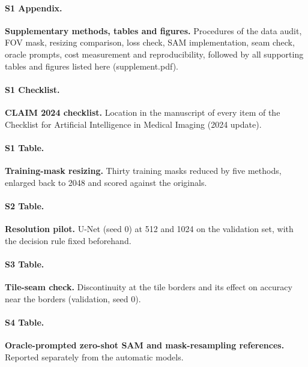 \paragraph*{S1 Appendix.}
\label{si:appendix}
{\bf Supplementary methods, tables and figures.} Procedures of the data audit, FOV mask, resizing comparison, loss check,
SAM implementation, seam check, oracle prompts, cost measurement and reproducibility, followed by all supporting tables
and figures listed here (supplement.pdf).

\paragraph*{S1 Checklist.}
\label{si:claim}
{\bf CLAIM 2024 checklist.} Location in the manuscript of every item of the Checklist for Artificial Intelligence in
Medical Imaging (2024 update).

\paragraph*{S1 Table.}
\label{si:resize}
{\bf Training-mask resizing.} Thirty training masks reduced by five methods, enlarged back to 2048 and scored against the
originals.

\paragraph*{S2 Table.}
\label{si:pilot}
{\bf Resolution pilot.} U-Net (seed 0) at 512 and 1024 on the validation set, with the decision rule fixed beforehand.

\paragraph*{S3 Table.}
\label{si:seam}
{\bf Tile-seam check.} Discontinuity at the tile borders and its effect on accuracy near the borders (validation, seed 0).

\paragraph*{S4 Table.}
\label{si:oracle}
{\bf Oracle-prompted zero-shot SAM and mask-resampling references.} Reported separately from the automatic models.

